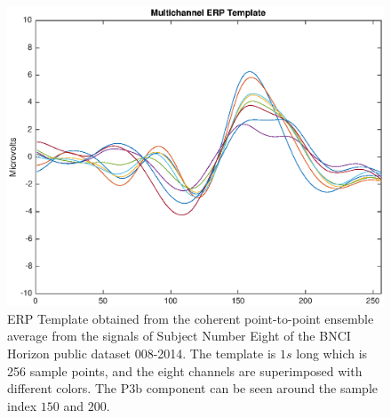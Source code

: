 
\begin{figure}[h!]
\centering
\includegraphics[width=12cm]{images/erptemplate1.eps}
\caption[P300 ERP Template]{ERP Template obtained from the coherent point-to-point ensemble average from the signals of Subject Number Eight of the BNCI Horizon public dataset 008-2014. The template is $1s$ long which is 256 sample points, and the eight channels are superimposed with different colors.  The P3b component can be seen around the sample index $150$ and $200$.}
\label{fig:erptemplate1}
\end{figure}


